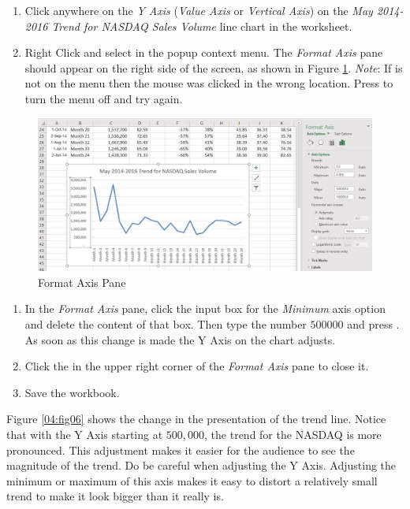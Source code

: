 \begin{enumerate}
	\item Click anywhere on the \textit{Y Axis} (\textit{Value Axis} or \textit{Vertical Axis}) on the \textit{May 2014-2016 Trend for NASDAQ Sales Volume} line chart in the  worksheet.
	\item Right Click and select  in the popup context menu. The \textit{Format Axis} pane should appear on the right side of the screen, as shown in Figure \ref{04:fig05}. \textit{Note}: If  is not on the menu then the mouse was clicked in the wrong location. Press  to turn the menu off and try again.
\end{enumerate}

\begin{figure}[H]
	\centering
	\includegraphics[width=\maxwidth{.95\linewidth}]{gfx/ch04_fig05}
	\caption{Format Axis Pane}
	\label{04:fig05}
\end{figure}

\begin{enumerate}[resume]
	\item In the \textit{Format Axis} pane, click the input box for the \textit{Minimum} axis option and delete the content of that box. Then type the number $ 500000 $ and press . As soon as this change is made the Y Axis on the chart adjusts.
	\item Click the  in the upper right corner of the \textit{Format Axis} pane to close it.
	\item Save the  workbook.
\end{enumerate}

Figure \ref{04:fig06} shows the change in the presentation of the trend line. Notice that with the Y Axis starting at $ 500,000 $, the trend for the NASDAQ is more pronounced. This adjustment makes it easier for the audience to see the magnitude of the trend. Do be careful when adjusting the Y Axis. Adjusting the minimum or maximum of this axis makes it easy to distort a relatively small trend to make it look bigger than it really is.

